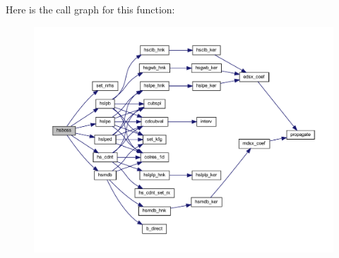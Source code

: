 Here is the call graph for this function\+:\nopagebreak
\begin{figure}[H]
\begin{center}
\leavevmode
\includegraphics[width=350pt]{Leroi__c_8f90_a940c66015c19ed9dab8214acf582b96c_cgraph}
\end{center}
\end{figure}
\mbox{\label{Leroi__c_8f90_a9b871caa6fa2f7ceadf6860a0a16a07b}} 
